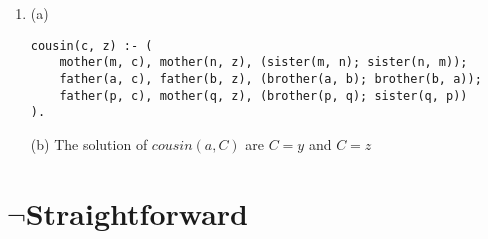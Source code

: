\documentclass[a4paper]{article}
\begin{document}
\begin{enumerate}
\\ 

(b) Need to prove $((\exists x \ P(x)) \rightarrow (\forall x \ \neg Q(x))) \vdash ((\exists x \ Q(x)) \rightarrow (\forall x \ \neg P(x)))$
\begin{mathpar}
\end{mathpar}

\item (a)
\begin{verbatim}
cousin(c, z) :- (
    mother(m, c), mother(n, z), (sister(m, n); sister(n, m));
    father(a, c), father(b, z), (brother(a, b); brother(b, a));
    father(p, c), mother(q, z), (brother(p, q); sister(q, p))
).
\end{verbatim}
(b) The solution of $cousin(a, C)$ are $C = y$ and $C = z$


\end{enumerate}


\section{$\neg$Straightforward}
\end{document}
